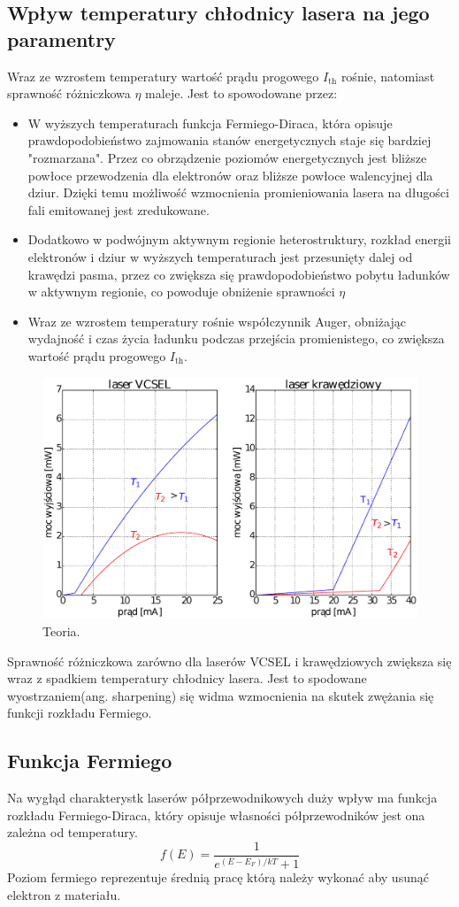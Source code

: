 \subsection{Wpływ temperatury chłodnicy lasera na jego paramentry}
Wraz ze wzrostem temperatury wartość prądu progowego $I_{\mathrm{th}}$ rośnie, natomiast sprawność różniczkowa $\eta$ maleje. Jest to spowodowane przez:
\begin{itemize}
\item W wyższych temperaturach funkcja Fermiego-Diraca, która opisuje prawdopodobieństwo zajmowania stanów energetycznych staje się bardziej "rozmarzana". Przez co obrządzenie poziomów energetycznych jest bliższe powłoce przewodzenia dla elektronów oraz bliższe powłoce walencyjnej dla dziur. Dzięki temu możliwość wzmocnienia promieniowania lasera na długości fali emitowanej jest zredukowane.
\item Dodatkowo w podwójnym aktywnym regionie heterostruktury, rozkład energii elektronów i dziur w wyższych temperaturach jest przesunięty dalej od krawędzi pasma, przez co zwiększa się prawdopodobieństwo pobytu ładunków w aktywnym regionie, co powoduje obniżenie sprawności $\eta$
\item Wraz ze wzrostem temperatury rośnie współczynnik Auger, obniżając wydajność i czas życia ładunku podczas przejścia promienistego, co zwiększa wartość prądu progowego $I_{\mathrm{th}}$.
\end{itemize}
\begin{figure}
\center
  \includegraphics[scale=0.30]{wykres2.eps}
  \caption{Teoria.}
  \label{teoria_rys_1}
\end{figure}
Sprawność różniczkowa zarówno dla laserów VCSEL i krawędziowych zwiększa się wraz z spadkiem temperatury chłodnicy lasera.
Jest to spodowane wyostrzaniem(ang. sharpening) się widma wzmocnienia na skutek zwężania się funkcji rozkładu Fermiego.
\subsection{Funkcja Fermiego}
Na wygłąd charakterystk laserów półprzewodnikowych duży wpływ ma funkcja rozkładu Fermiego-Diraca, który opisuje
własności półprzewodników jest ona zależna od temperatury.
\begin{equation}
f(E) = \frac{1}{e^{(E-E_F)/kT} + 1}
\end{equation}
Poziom fermiego reprezentuje średnią pracę którą należy wykonać aby usunąć elektron z materiału.

\newpage